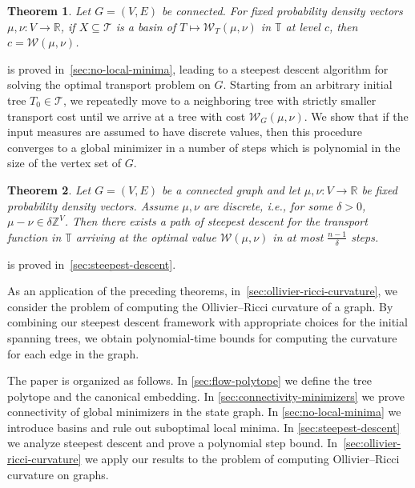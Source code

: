\documentclass[10pt,a4paper]{amsart}
\newcommand{\wass}{{\mathcal{W}}}
\newcommand{\setoftrees}{{\mathcal{T}}}
\newcommand{\stategraph}{{\mathbb{T}}}
\newtheorem{theorem}{Theorem}[section]
\begin{document}
    \begin{theorem}\label{thm:intro-basins}
        Let $G=(V,E)$ be connected. For fixed probability density vectors $\mu,\nu:V\to\mathbb{R}$, if $X\subseteq\setoftrees$ is a basin of $T\mapsto\wass_T(\mu,\nu)$ in $\stategraph$ at level $c$, then $c=\wass(\mu,\nu)$.
    \end{theorem}

     is proved in~\cref{sec:no-local-minima}, leading to a steepest descent algorithm for solving the optimal transport problem on $G$. Starting from an arbitrary initial tree $T_0\in\setoftrees$, we repeatedly move to a neighboring tree with strictly smaller transport cost until we arrive at a tree with cost $\wass_G(\mu,\nu)$. We show that if the input measures are assumed to have discrete values, then this procedure converges to a global minimizer in a number of steps which is polynomial in the size of the vertex set of $G$.

    \begin{theorem}\label{thm:steepest-descent-empirical}
        Let $G=(V,E)$ be a connected graph and let $\mu,\nu:V\to\mathbb{R}$ be fixed probability density vectors. Assume $\mu,\nu$ are \emph{discrete}, i.e., for some $\delta>0$, $\mu-\nu\in\delta\mathbb{Z}^{V}$. Then there exists a path of steepest descent for the transport function in $\stategraph$ arriving at the optimal value $\wass(\mu,\nu)$ in at most $\frac{n-1}{\delta}$ steps.
    \end{theorem}

     is proved in~\cref{sec:steepest-descent}.

    As an application of the preceding theorems, in~\cref{sec:ollivier-ricci-curvature}, we consider the problem of computing the Ollivier--Ricci curvature of a graph. By combining our steepest descent framework with appropriate choices for the initial spanning trees, we obtain polynomial-time bounds for computing the curvature for each edge in the graph.

    The paper is organized as follows. In \cref{sec:flow-polytope} we define the tree polytope and the canonical embedding. In \cref{sec:connectivity-minimizers} we prove connectivity of global minimizers in the state graph. In \cref{sec:no-local-minima} we introduce basins and rule out suboptimal local minima. In \cref{sec:steepest-descent} we analyze steepest descent and prove a polynomial step bound. In~\cref{sec:ollivier-ricci-curvature} we apply our results to the problem of computing Ollivier--Ricci curvature on graphs. 
\end{document}
